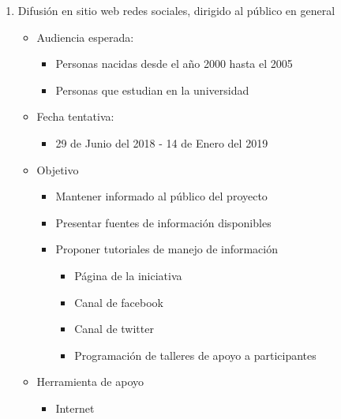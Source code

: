 \documentclass{article}
\begin{document}
\begin{enumerate}
\item Difusión en sitio web redes sociales, dirigido al público en general 
\begin{itemize}
\item Audiencia esperada:
\begin{itemize}
\item Personas nacidas desde el año 2000 hasta el 2005
\item Personas que estudian en la universidad
\end{itemize}
\item Fecha tentativa:
\begin{itemize}
\item 29 de Junio del 2018 - 14 de Enero del 2019
\end{itemize}
\item Objetivo
\begin{itemize}
\item Mantener informado al público del proyecto
\item Presentar fuentes de información disponibles
\item Proponer tutoriales de manejo de información
\begin{itemize}
\item Página de la iniciativa 
\item Canal de facebook
\item Canal de twitter
\item Programación de talleres de apoyo a participantes
\end{itemize}
\end{itemize}
\item Herramienta de apoyo
\begin{itemize}
\item Internet
\end{itemize}
\end{itemize}


\end{enumerate}
\end{document}
